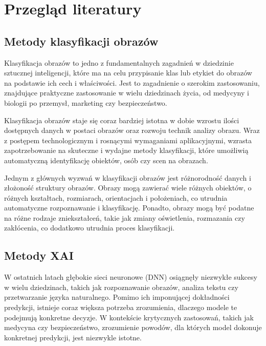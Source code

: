 
\chapter*{Przegląd literatury}

\section*{Metody klasyfikacji obrazów}

Klasyfikacja obrazów to jedno z fundamentalnych zagadnień w dziedzinie sztucznej inteligencji, które ma na celu przypisanie klas lub etykiet do obrazów na podstawie ich cech i właściwości.
Jest to zagadnienie o szerokim zastosowaniu, znajdujące praktyczne zastosowanie w wielu dziedzinach życia, od medycyny i biologii po przemysł, marketing czy bezpieczeństwo.

Klasyfikacja obrazów staje się coraz bardziej istotna w dobie wzrostu ilości dostępnych danych w postaci obrazów oraz rozwoju technik analizy obrazu.
Wraz z postępem technologicznym i rosnącymi wymaganiami aplikacyjnymi, wzrasta zapotrzebowanie na skuteczne i wydajne metody klasyfikacji, które umożliwią automatyczną identyfikację obiektów, osób czy scen na obrazach.

Jednym z głównych wyzwań w klasyfikacji obrazów jest różnorodność danych i złożoność struktury obrazów.
Obrazy mogą zawierać wiele różnych obiektów, o różnych kształtach, rozmiarach, orientacjach i położeniach, co utrudnia automatyczne rozpoznawanie i klasyfikację.
Ponadto, obrazy mogą być podatne na różne rodzaje zniekształceń, takie jak zmiany oświetlenia, rozmazania czy zakłócenia, co dodatkowo utrudnia proces klasyfikacji.




\section*{Metody XAI}
W ostatnich latach głębokie sieci neuronowe (DNN) osiągnęły niezwykłe sukcesy w wielu dziedzinach, takich jak rozpoznawanie obrazów, analiza tekstu czy przetwarzanie języka naturalnego.
Pomimo ich imponującej dokładności predykcji, istnieje coraz większa potrzeba zrozumienia, dlaczego modele te podejmują konkretne decyzje.
W kontekście krytycznych zastosowań, takich jak medycyna czy bezpieczeństwo, zrozumienie powodów, dla których model dokonuje konkretnej predykcji, jest niezwykle istotne.

